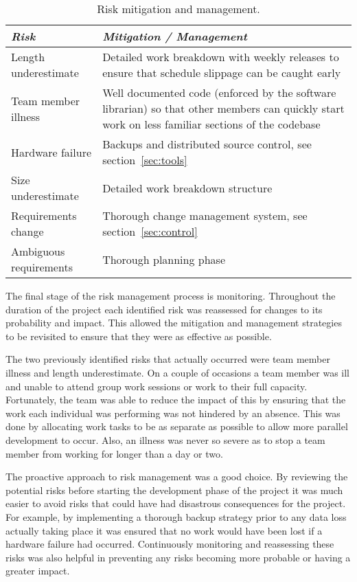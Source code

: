 \begin{table*}
	\small
	\begin{tabular}{l p{37em}}
		\toprule
		\emph{Risk} & \emph{Mitigation / Management} \\
		\midrule
		Length underestimate & Detailed work breakdown with weekly releases to ensure that
			schedule slippage can be caught early \\
		Team member illness & Well documented code (enforced by the software librarian) so
			that other members can quickly start work on less familiar sections of
			the codebase \\
		Hardware failure & Backups and distributed source control, see section~\ref{sec:tools} \\
		Size underestimate & Detailed work breakdown structure \\
		Requirements change & Thorough change management system, see section~\ref{sec:control} \\
		Ambiguous requirements & Thorough planning phase \\
		\bottomrule
	\end{tabular}
	\vspace{1.5em}
	\caption[Risk mitigation and management]{Risk mitigation and management.}
	\label{tab:rmm}
\end{table*}
 
The final stage of the risk management process is monitoring. Throughout the duration of
the project each identified risk was reassessed for changes to its probability and
impact. This allowed the mitigation and management strategies to be revisited to ensure that
they were as effective as possible.
 
The two previously identified risks that actually occurred were team member illness and length underestimate.
On a couple of occasions a team member was ill and unable to attend group work sessions or work to their full
capacity. Fortunately, the team was able to reduce the impact of this by ensuring that the work each individual
was performing was not hindered by an absence. This was done by allocating work tasks to be as separate as
possible to allow more parallel development to occur. Also, an illness was never so severe as to stop a team
member from working for longer than a day or two.
 
%
 
The proactive approach to risk management was a good choice. By reviewing the potential
risks before starting the development phase of the project it was much easier to avoid risks that could
have had disastrous consequences for the project. For example, by implementing a thorough backup strategy
prior to any data loss actually taking place it was ensured that no work would have been lost if a hardware
failure had occurred. Continuously monitoring and reassessing these risks was also helpful in preventing
any risks becoming more probable or having a greater impact.
